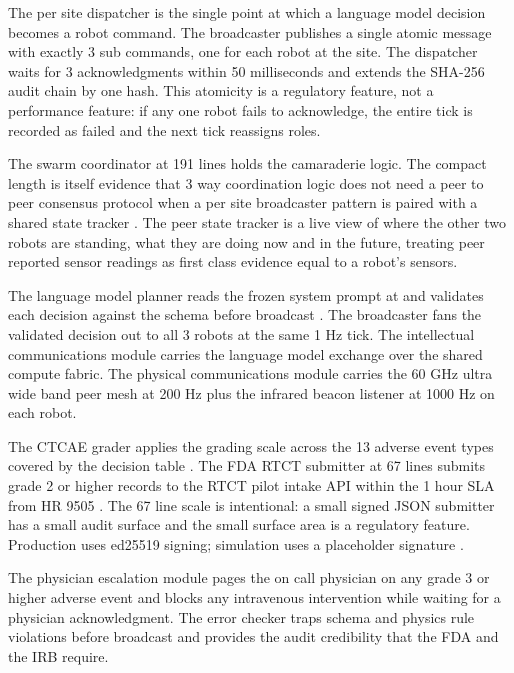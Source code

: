 \begin{sectionaccent}
The per site dispatcher  is the single point at
which a language model decision becomes a robot command. The
broadcaster publishes a single atomic message with exactly 3 sub
commands, one for each robot at the site. The dispatcher waits for 3
acknowledgments within 50 milliseconds and extends the SHA-256 audit
chain by one hash. This atomicity is a regulatory feature, not a
performance feature: if any one robot fails to acknowledge, the
entire tick is recorded as failed and the next tick reassigns roles.

The swarm coordinator at 191 lines holds the camaraderie logic. The
compact length is itself evidence that 3 way coordination logic does
not need a peer to peer consensus protocol when a per site
broadcaster pattern is paired with a shared state tracker
\cite{kawchak_2026_humanoid_instructions}. The peer state tracker is a live view of where the other two robots are standing,
what they are doing now and in the future, treating peer
reported sensor readings as first class evidence equal to a robot's sensors.

The language model planner reads the frozen system prompt at
 and validates each decision against the
 schema before broadcast
\cite{anthropic_claude_opus_47_2026}. The broadcaster fans the
validated decision out to all 3 robots at the same 1 Hz tick. The
intellectual communications module carries the language model
exchange over the shared compute fabric. The physical communications
module carries the 60 GHz ultra wide band peer mesh at 200 Hz plus
the infrared beacon listener at 1000 Hz on each robot.

The CTCAE grader applies the grading scale across the 13
adverse event types covered by the decision table
\cite{ctcae_v5_2017}. The FDA RTCT submitter at 67 lines submits
grade 2 or higher records to the RTCT pilot intake API within the 1
hour SLA from HR 9505 \cite{fda_rtct_2026, fda2026realtime}. The 67
line scale is intentional: a small signed JSON submitter has a small
audit surface and the small surface area is a regulatory feature.
Production uses ed25519 signing; simulation uses a placeholder
signature \cite{iec_62304}.

The physician escalation module pages the on call physician on any
grade 3 or higher adverse event and blocks any intravenous
intervention while waiting for a physician acknowledgment. The error
checker traps schema and physics rule violations before broadcast and
provides the audit credibility that the FDA and the IRB require.


\end{sectionaccent}
